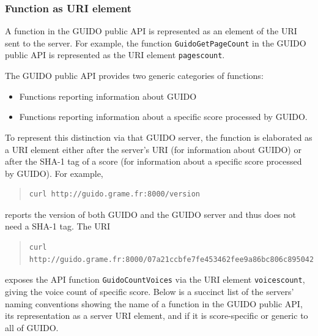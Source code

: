 \documentclass{article}
\begin{document}
\subsubsection{Function as URI element}
A function in the GUIDO public API is represented as an element of the URI sent to the server.  For example, the function \verb=GuidoGetPageCount= in the GUIDO public API is represented as the URI element \verb=pagescount=.\par
The GUIDO public API provides two generic categories of functions:
\begin{itemize}
\item Functions reporting information about GUIDO
\item Functions reporting information about a specific score processed by GUIDO.
\end{itemize}
To represent this distinction via that GUIDO server, the function is elaborated as a URI element either after the server's URI (for information about GUIDO) or after the SHA-1 tag of a score (for information about a specific score processed by GUIDO).  For example,
\begin{quote}
\begingroup
\fontsize{7.5pt}{12pt}\selectfont
\begin{verbatim}
curl http://guido.grame.fr:8000/version
\end{verbatim}
\endgroup
\end{quote}
reports the version of both GUIDO and the GUIDO server and thus does not need a SHA-1 tag.  The URI
\begin{quote}
\begingroup
\fontsize{7.5pt}{12pt}\selectfont
\begin{verbatim}
curl http://guido.grame.fr:8000/07a21ccbfe7fe453462fee9a86bc806c8950423f/voicescount
\end{verbatim}
\endgroup
\end{quote}
exposes the API function \verb=GuidoCountVoices= via the URI element \verb=voicescount=, giving the voice count of specific score.  Below is a succinct list of the servers' naming conventions showing the name of a function in the GUIDO public API, its representation as a server URI element, and if it is score-specific or generic to all of GUIDO.
\end{document}
